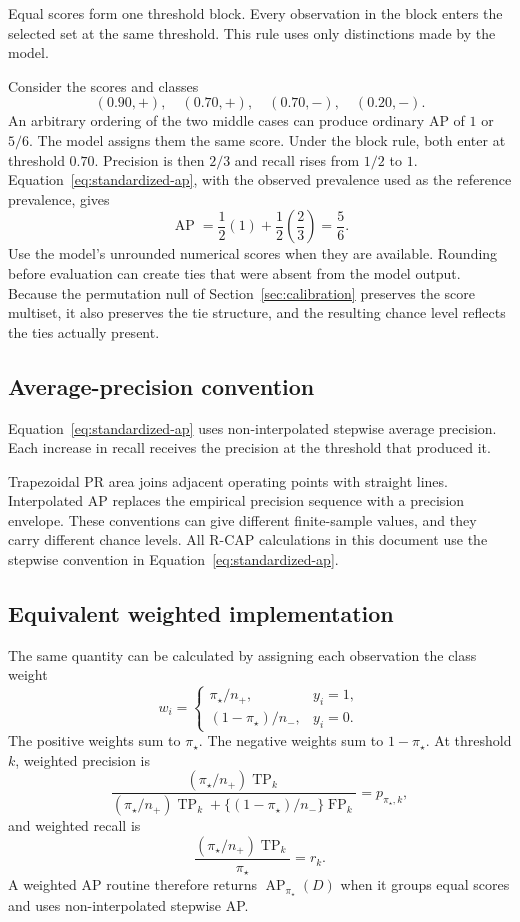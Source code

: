 \documentclass[11pt]{article}
\newcommand{\AP}{\operatorname{AP}}
\theoremstyle{remark}
\begin{document}
Equal scores form one threshold block. Every observation in the block enters the selected set at the same threshold. This rule uses only distinctions made by the model.

Consider the scores and classes
\[
(0.90,+),\quad(0.70,+),\quad(0.70,-),\quad(0.20,-).
\]
An arbitrary ordering of the two middle cases can produce ordinary AP of $1$ or $5/6$. The model assigns them the same score. Under the block rule, both enter at threshold $0.70$. Precision is then $2/3$ and recall rises from $1/2$ to $1$. Equation~\eqref{eq:standardized-ap}, with the observed prevalence used as the reference prevalence, gives
\[
\AP
=
\frac12(1)+\frac12\left(\frac23\right)
=
\frac56.
\]
Use the model's unrounded numerical scores when they are available. Rounding before evaluation can create ties that were absent from the model output. Because the permutation null of Section~\ref{sec:calibration} preserves the score multiset, it also preserves the tie structure, and the resulting chance level reflects the ties actually present.

\subsection{Average-precision convention}

Equation~\eqref{eq:standardized-ap} uses non-interpolated stepwise average precision. Each increase in recall receives the precision at the threshold that produced it.

Trapezoidal PR area joins adjacent operating points with straight lines. Interpolated AP replaces the empirical precision sequence with a precision envelope. These conventions can give different finite-sample values, and they carry different chance levels. All R-CAP calculations in this document use the stepwise convention in Equation~\eqref{eq:standardized-ap}.

\subsection{Equivalent weighted implementation}

The same quantity can be calculated by assigning each observation the class weight
\begin{equation}
w_i
=
\begin{cases}
\pi_\star/n_+, & y_i=1,\\[4pt]
(1-\pi_\star)/n_-, & y_i=0.
\end{cases}
\label{eq:reference-weights}
\end{equation}
The positive weights sum to $\pi_\star$. The negative weights sum to $1-\pi_\star$. At threshold $k$, weighted precision is
\[
\frac{(\pi_\star/n_+)\operatorname{TP}_k}
{(\pi_\star/n_+)\operatorname{TP}_k
+
\{(1-\pi_\star)/n_-\}\operatorname{FP}_k}
=
p_{\pi_\star,k},
\]
and weighted recall is
\[
\frac{(\pi_\star/n_+)\operatorname{TP}_k}{\pi_\star}
=
r_k.
\]
A weighted AP routine therefore returns $\AP_{\pi_\star}(D)$ when it groups equal scores and uses non-interpolated stepwise AP.
\end{document}
